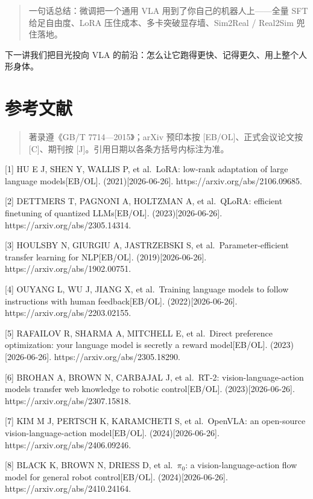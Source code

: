 \documentclass[
  chinese,
]{ctexart}
\begin{document}
\begin{quote}
一句话总结：微调把一个通用 VLA 用到了你自己的机器人上------全量 SFT
给足自由度、LoRA 压住成本、多卡突破显存墙、Sim2Real / Real2Sim
兜住落地。
\end{quote}

下一讲我们把目光投向 VLA
的前沿：怎么让它跑得更快、记得更久、用上整个人形身体。

\section{参考文献}\label{ux53c2ux8003ux6587ux732e}

\begin{quote}
著录遵《GB/T 7714---2015》；arXiv 预印本按 {[}EB/OL{]}、正式会议论文按
{[}C{]}、期刊按 {[}J{]}。引用日期以各条方括号内标注为准。
\end{quote}

{[}1{]} HU E J, SHEN Y, WALLIS P, et al.~LoRA: low-rank adaptation of
large language models{[}EB/OL{]}. (2021){[}2026-06-26{]}.
https://arxiv.org/abs/2106.09685.

{[}2{]} DETTMERS T, PAGNONI A, HOLTZMAN A, et al.~QLoRA: efficient
finetuning of quantized LLMs{[}EB/OL{]}. (2023){[}2026-06-26{]}.
https://arxiv.org/abs/2305.14314.

{[}3{]} HOULSBY N, GIURGIU A, JASTRZEBSKI S, et al.~Parameter-efficient
transfer learning for NLP{[}EB/OL{]}. (2019){[}2026-06-26{]}.
https://arxiv.org/abs/1902.00751.

{[}4{]} OUYANG L, WU J, JIANG X, et al.~Training language models to
follow instructions with human feedback{[}EB/OL{]}.
(2022){[}2026-06-26{]}. https://arxiv.org/abs/2203.02155.

{[}5{]} RAFAILOV R, SHARMA A, MITCHELL E, et al.~Direct preference
optimization: your language model is secretly a reward model{[}EB/OL{]}.
(2023){[}2026-06-26{]}. https://arxiv.org/abs/2305.18290.

{[}6{]} BROHAN A, BROWN N, CARBAJAL J, et al.~RT-2:
vision-language-action models transfer web knowledge to robotic
control{[}EB/OL{]}. (2023){[}2026-06-26{]}.
https://arxiv.org/abs/2307.15818.

{[}7{]} KIM M J, PERTSCH K, KARAMCHETI S, et al.~OpenVLA: an open-source
vision-language-action model{[}EB/OL{]}. (2024){[}2026-06-26{]}.
https://arxiv.org/abs/2406.09246.

{[}8{]} BLACK K, BROWN N, DRIESS D, et al.~\(\pi_0\): a
vision-language-action flow model for general robot control{[}EB/OL{]}.
(2024){[}2026-06-26{]}. https://arxiv.org/abs/2410.24164.
\end{document}
